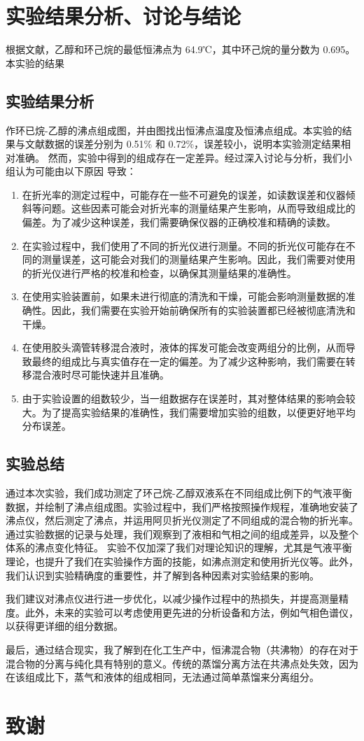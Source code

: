 \documentclass[12pt,hyperref,a4paper,UTF8]{ctexart}
\begin{document}
\section{实验结果分析、讨论与结论}
根据文献\cite{1}，乙醇和环己烷的最低恒沸点为 64.9℃，其中环己烷的量分数为 0.695。本实验的结果
\subsection{实验结果分析}
作环已烷-乙醇的沸点组成图，并由图找出恒沸点温度及恒沸点组成。本实验的结果与文献数据的误差分别为 0.51\% 和 0.72\%，误差较小，说明本实验测定结果相对准确。
然而，实验中得到的组成存在一定差异。经过深入讨论与分析，我们小组认为可能由以下原因
导致：
\begin{enumerate}
    \item  在折光率的测定过程中，可能存在一些不可避免的误差，如读数误差和仪器倾斜等问题。这些因素可能会对折光率的测量结果产生影响，从而导致组成比的偏差。为了减少这种误差，我们需要确保仪器的正确校准和精确的读数。
    \item 在实验过程中，我们使用了不同的折光仪进行测量。不同的折光仪可能存在不同的测量误差，这可能会对我们的测量结果产生影响。因此，我们需要对使用的折光仪进行严格的校准和检查，以确保其测量结果的准确性。
    \item 在使用实验装置前，如果未进行彻底的清洗和干燥，可能会影响测量数据的准确性。因此，我们需要在实验开始前确保所有的实验装置都已经被彻底清洗和干燥。
    \item 在使用胶头滴管转移混合液时，液体的挥发可能会改变两组分的比例，从而导致最终的组成比与真实值存在一定的偏差。为了减少这种影响，我们需要在转移混合液时尽可能快速并且准确。
    \item 由于实验设置的组数较少，当一组数据存在误差时，其对整体结果的影响会较大。为了提高实验结果的准确性，我们需要增加实验的组数，以便更好地平均分布误差。
\end{enumerate}
\subsection{实验总结}
通过本次实验，我们成功测定了环己烷-乙醇双液系在不同组成比例下的气液平衡数据，并绘制了沸点组成图。实验过程中，我们严格按照操作规程，准确地安装了沸点仪，然后测定了沸点，并运用阿贝折光仪测定了不同组成的混合物的折光率。通过实验数据的记录与处理，我们观察到了液相和气相之间的组成差异，以及整个体系的沸点变化特征。
实验不仅加深了我们对理论知识的理解，尤其是气液平衡理论，也提升了我们在实验操作方面的技能，如沸点测定和使用折光仪等。此外，我们认识到实验精确度的重要性，并了解到各种因素对实验结果的影响。

我们建议对沸点仪进行进一步优化，以减少操作过程中的热损失，并提高测量精度。此外，未来的实验可以考虑使用更先进的分析设备和方法，例如气相色谱仪，以获得更详细的组分数据。

最后，通过结合现实，我了解到在化工生产中，恒沸混合物（共沸物）的存在对于混合物的分离与纯化具有特别的意义。传统的蒸馏分离方法在共沸点处失效，因为在该组成比下，蒸气和液体的组成相同，无法通过简单蒸馏来分离组分。

\section{致谢}


\end{document}
